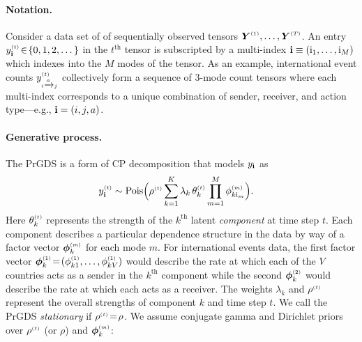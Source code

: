 \documentclass{article}
\begin{document}
\paragraph{Notation.}Consider a data set of of sequentially observed tensors $\boldsymbol{Y}^{\mathsmaller{(1)}},\dots,\boldsymbol{Y}^{\mathsmaller{(T)}}$. An entry $\ydt \!\in\! \{0,1,2,\dots\}$ in the $t^{\textrm{th}}$ tensor is subscripted by a multi-index $\textbf{\textrm{i}} \equiv (\textrm{i}_1,\dots,\textrm{i}_M)$ which indexes into the $M$ modes of the tensor. As an example, international event counts $y^{\mathsmaller{(t)}}_{\mathsmaller{i \xrightarrow{a} j}}$ collectively form a sequence of 3-mode count tensors where each multi-index corresponds to a unique combination of sender, receiver, and action type---e.g., $\textbf{\textrm{i}} = (i, j, a)$.

\paragraph{Generative process.} The PrGDS is a form of CP decomposition \cite{harshman1970foundations} that models $y_{\textbf{\textrm{i}}}$ as
\begin{align}
\label{eq:tensor_likelihood}
\ydt &\sim \textrm{Pois}\Big(\rhot \sum_{k = 1}^K \lambda_k \, \thetakt \prod_{m=1}^M \phi^{\mathsmaller{(m)}}_{k \osub_m}\Big).
\end{align}
Here $\thetakt$ represents the strength of the $k^{\textrm{th}}$ latent \emph{component} at time step $t$. Each component describes a particular dependence structure in the data by way of a factor vector $\boldsymbol{\phi}^{\mathsmaller{(m)}}_{k}$ for each mode $m$. For international events data, the first factor vector $\boldsymbol{\phi}^{\mathsmaller{(1)}}_{k} \teq (\phi^{\mathsmaller{(1)}}_{k1},\dots,\phi^{\mathsmaller{(1)}}_{kV})$ would describe the rate at which each of the $V$ countries acts as a sender in the $k^{\textrm{th}}$ component while the second $\boldsymbol{\phi}^{\mathsmaller{(2)}}_{k}$ would describe the rate at which each acts as a receiver. The weights $\lambda_k$ and $\rho^{\mathsmaller{(t)}}$ represent the overall strengths of component $k$ and time step $t$. We call the PrGDS \emph{stationary} if $\rhot \teq \rho$. We assume conjugate gamma and Dirichlet priors over $\rho^{\mathsmaller{(t)}}$ (or $\rho$) and $\boldsymbol{\phi}^{\mathsmaller{(m)}}_{k}$:~
\end{document}
